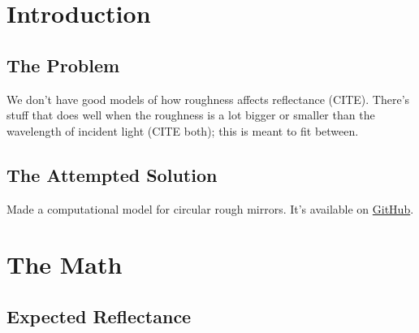 \documentclass[etd,oneside,senior]{BYUPhys}
\begin{document}
\frontmatter

\makepreliminarypages

\tableofcontents

\mainmatter






\chapter{Introduction} \label{chap:intro}

\section{The Problem} \label{sec:problem}

We don't have good models of how roughness affects reflectance (CITE). There's stuff that does well when the roughness is a lot bigger or smaller than the wavelength of incident light (CITE both); this is meant to fit between.



\section{The Attempted Solution} \label{sec:attempted_solution}

Made a computational model for circular rough mirrors. It's available on \href{https://github.com/mjg0/Mirrors.jl}{GitHub}.







\chapter{The Math} \label{chap:math}

\section{Expected Reflectance} \label{sec:expected_results}
\end{document}
